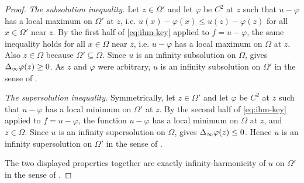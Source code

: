\begin{proof}
\emph{The subsolution inequality.} Let $z\in\Omega'$ and let $\varphi$ be $C^2$
at $z$ such that $u-\varphi$ has a local maximum on $\Omega'$ at $z$, i.e.
$u(x)-\varphi(x)\le u(z)-\varphi(z)$ for all $x\in\Omega'$ near $z$. By the
first half of \eqref{eq:ihm-key} applied to $f=u-\varphi$, the same inequality
holds for all $x\in\Omega$ near $z$, i.e. $u-\varphi$ has a local maximum on
$\Omega$ at $z$. Also $z\in\Omega$ because $\Omega'\subseteq\Omega$. Since $u$
is an infinity subsolution on $\Omega$,  gives
$\Delta_{\infty}\varphi(z)\ge0$. As $z$ and $\varphi$ were arbitrary, $u$ is an infinity
subsolution on $\Omega'$ in the sense of .

\emph{The supersolution inequality.} Symmetrically, let $z\in\Omega'$ and let
$\varphi$ be $C^2$ at $z$ such that $u-\varphi$ has a local minimum on $\Omega'$
at $z$. By the second half of \eqref{eq:ihm-key} applied to $f=u-\varphi$, the
function $u-\varphi$ has a local minimum on $\Omega$ at $z$, and
$z\in\Omega$. Since $u$ is an infinity supersolution on $\Omega$,
 gives $\Delta_{\infty}\varphi(z)\le0$. Hence $u$ is an
infinity supersolution on $\Omega'$ in the sense of
.

The two displayed properties together are exactly infinity-harmonicity of $u$ on
$\Omega'$ in the sense of .
\end{proof}

